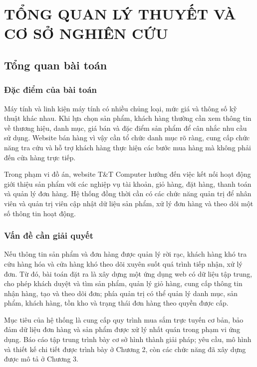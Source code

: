 \chapter{TỔNG QUAN LÝ THUYẾT VÀ CƠ SỞ NGHIÊN CỨU}\label{chap1_intro}
\vspace{-40pt}
\renewcommand{\thesection}{\thechapter.\arabic{section}}
\setcounter{section}{0}

\section{Tổng quan bài toán}
\subsection{Đặc điểm của bài toán}
Máy tính và linh kiện máy tính có nhiều chủng loại, mức giá và thông số kỹ thuật khác nhau. Khi lựa chọn sản phẩm, khách hàng thường cần xem thông tin về thương hiệu, danh mục, giá bán và đặc điểm sản phẩm để cân nhắc nhu cầu sử dụng. Website bán hàng vì vậy cần tổ chức danh mục rõ ràng, cung cấp chức năng tra cứu và hỗ trợ khách hàng thực hiện các bước mua hàng mà không phải đến cửa hàng trực tiếp.

Trong phạm vi đồ án, website T\&T Computer hướng đến việc kết nối hoạt động giới thiệu sản phẩm với các nghiệp vụ tài khoản, giỏ hàng, đặt hàng, thanh toán và quản lý đơn hàng. Hệ thống đồng thời cần có các chức năng quản trị để nhân viên và quản trị viên cập nhật dữ liệu sản phẩm, xử lý đơn hàng và theo dõi một số thông tin hoạt động.

\subsection{Vấn đề cần giải quyết}
Nếu thông tin sản phẩm và đơn hàng được quản lý rời rạc, khách hàng khó tra cứu hàng hóa và cửa hàng khó theo dõi xuyên suốt quá trình tiếp nhận, xử lý đơn. Từ đó, bài toán đặt ra là xây dựng một ứng dụng web có dữ liệu tập trung, cho phép khách duyệt và tìm sản phẩm, quản lý giỏ hàng, cung cấp thông tin nhận hàng, tạo và theo dõi đơn; phía quản trị có thể quản lý danh mục, sản phẩm, khách hàng, tồn kho và trạng thái đơn hàng theo quyền được cấp.

Mục tiêu của hệ thống là cung cấp quy trình mua sắm trực tuyến cơ bản, bảo đảm dữ liệu đơn hàng và sản phẩm được xử lý nhất quán trong phạm vi ứng dụng. Báo cáo tập trung trình bày cơ sở hình thành giải pháp; yêu cầu, mô hình và thiết kế chi tiết được trình bày ở Chương 2, còn các chức năng đã xây dựng được mô tả ở Chương 3.

